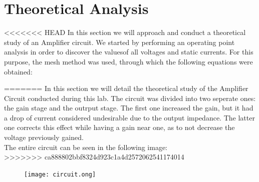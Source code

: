 \section{Theoretical Analysis}
\label{sec:analysis}


<<<<<<< HEAD
In this section we will approach and conduct a theoretical study of an Amplifier circuit. We started by performing an operating point analysis in order to discover the values ​​of all voltages and static currents. For this purpose, the mesh method was used, through which the following equations were obtained:


=======
In this section we will detail the theoretical study of the Amplifier Circuit conducted during this lab. The circuit was divided into two seperate ones: the gain stage and the outrput stage. The first one increased the gain, but it had a drop of current considered undesirable due to the output impedance. The latter one corrects this effect while having a gain near one, as to not decrease the voltage previously gained.\\
The entire circuit can be seen in the following image:\\
>>>>>>> ca888802bbf8324d923c1a4d2572062541174014

\FloatBarrier

\begin{figure}
  \texttt{[image: circuit.ong]}
  \caption{}
  \label{}
\end{figure}
\FloatBarrier

